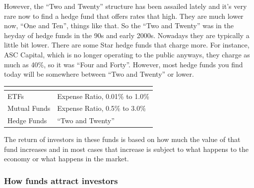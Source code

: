 \documentclass[12pt]{article}
\newcommand{\q}[1]{``#1''}
\begin{document}
However, the \q{Two and Twenty} structure has been assailed lately and it's very rare now to find a hedge fund that offers rates that high. They are much lower now, \q{One and Ten}, things like that. So the \q{Two and Twenty} was in the heyday of hedge funds in the 90s and early 2000s. Nowadays they are typically a little bit lower. There are some Star hedge funds that charge more. For instance, ASC Capital, which is no longer operating to the public anyways, they charge as much as 40\%, so it was \q{Four and Forty}. However, most hedge funds you find today will be somewhere between \q{Two and Twenty} or lower. 

\begin{table}[!ht]
\centering
\begin{tabular}{l | l }
\multicolumn{1}{c}{} \\ [-10pt]
\hline
 ETFs & Expense Ratio, 0.01\% to 1.0\% \\
\hline
Mutual Funds & Expense Ratio, 0.5\% to 3.0\% \\
\hline
Hedge Funds & \q{Two and Twenty}\\
\hline
\end{tabular}
\end{table}

\noindent
The return of investors in these funds is based on how much the value of that fund increases and in most cases that increase is subject to what happens to the economy or what happens in the market. 

\subsubsection{How funds attract investors}
\end{document}
